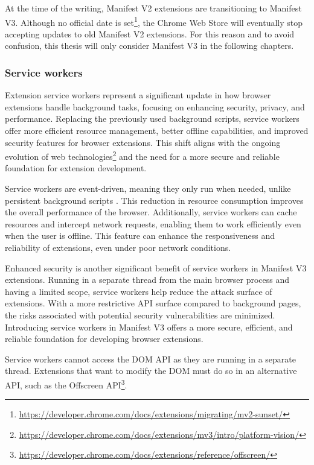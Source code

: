 At the time of the writing, Manifest V2 extensions are transitioning to Manifest V3. Although no official date is set\footnote{\url{https://developer.chrome.com/docs/extensions/migrating/mv2-sunset/}}, the Chrome Web Store will eventually stop accepting updates to old Manifest V2 extensions. For this reason and to avoid confusion, this thesis will only consider Manifest V3 in the following chapters.

\subsubsection{Service workers}

Extension service workers represent a significant update in how browser extensions handle background tasks, focusing on enhancing security, privacy, and performance. Replacing the previously used background scripts, service workers offer more efficient resource management, better offline capabilities, and improved security features for browser extensions. This shift aligns with the ongoing evolution of web technologies\footnote{{\url{https://developer.chrome.com/docs/extensions/mv3/intro/platform-vision/}}} and the need for a more secure and reliable foundation for extension development.

Service workers are event-driven, meaning they only run when needed, unlike persistent background scripts \cite{ChromeWebExtensions}. This reduction in resource consumption improves the overall performance of the browser. Additionally, service workers can cache resources and intercept network requests, enabling them to work efficiently even when the user is offline. This feature can enhance the responsiveness and reliability of extensions, even under poor network conditions.

Enhanced security is another significant benefit of service workers in Manifest V3 extensions. Running in a separate thread from the main browser process and having a limited scope, service workers help reduce the attack surface of extensions. With a more restrictive API surface compared to background pages, the risks associated with potential security vulnerabilities are minimized. Introducing service workers in Manifest V3 offers a more secure, efficient, and reliable foundation for developing browser extensions.

Service workers cannot access the DOM API as they are running in a separate thread. Extensions that want to modify the DOM must do so in an alternative API, such as the Offscreen API\footnote{\url{https://developer.chrome.com/docs/extensions/reference/offscreen/}}.

